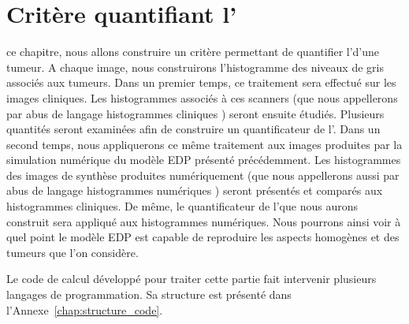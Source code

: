 \documentclass[main.tex]{subfiles}
\begin{document}



\chapter{Critère quantifiant l'\hetero \label{chap:crit_hetero}}
 ce chapitre, nous allons construire un critère permettant de quantifier l'\hetero d'une tumeur.
A chaque image, nous construirons l'histogramme des niveaux de gris associés aux tumeurs. 
Dans un premier temps, ce traitement sera effectué sur les images cliniques. %
Les histogrammes associés à ces scanners (que nous appellerons par abus de langage \og histogrammes cliniques \fg) seront ensuite étudiés. Plusieurs quantités seront examinées afin de construire un quantificateur de l'\hetero.
Dans un second temps, nous appliquerons ce même traitement aux images produites par la simulation numérique du modèle EDP présenté précédemment. Les histogrammes des images de synthèse produites numériquement (que nous  appellerons aussi par abus de langage \og histogrammes numériques \fg) seront présentés et comparés aux histogrammes cliniques. De même, le quantificateur de l'\hetero que nous aurons construit sera appliqué aux histogrammes numériques. Nous pourrons ainsi voir à quel point le modèle EDP est capable de reproduire les aspects homogènes et \heterogenes des tumeurs que l'on considère.


Le code de calcul développé pour traiter cette partie fait intervenir plusieurs langages de programmation. Sa structure est présenté dans l'Annexe~\ref{chap:structure_code}. 
\end{document}
